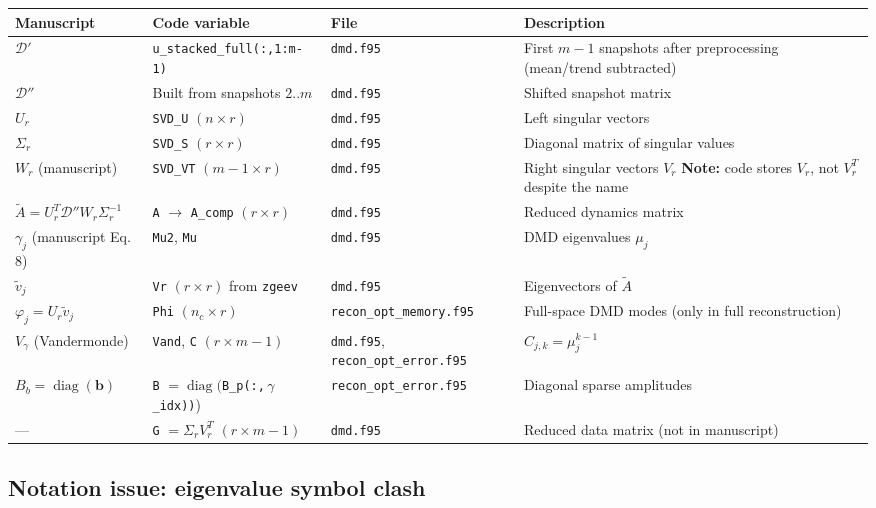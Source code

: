 \documentclass[11pt,a4paper]{article}
\newcommand{\diag}{\operatorname{diag}}
\begin{document}
\begin{center}
\renewcommand{\arraystretch}{1.25}
\begin{tabular}{@{}lll p{6.2cm}@{}}
\toprule
\textbf{Manuscript} & \textbf{Code variable} & \textbf{File} & \textbf{Description} \\
\midrule
$\mathcal{D}'$ & \texttt{u\_stacked\_full(:,1:m-1)} & \texttt{dmd.f95} & First $m{-}1$ snapshots after preprocessing (mean/trend subtracted) \\
$\mathcal{D}''$ & Built from snapshots $2..m$ & \texttt{dmd.f95} & Shifted snapshot matrix \\
$U_r$ & \texttt{SVD\_U} $(n \times r)$ & \texttt{dmd.f95} & Left singular vectors \\
$\Sigma_r$ & \texttt{SVD\_S} $(r \times r)$ & \texttt{dmd.f95} & Diagonal matrix of singular values \\
$W_r$ (manuscript) & \texttt{SVD\_VT} $(m{-}1 \times r)$ & \texttt{dmd.f95} & Right singular vectors $V_r$ \newline \textbf{Note:} code stores $V_r$, not $V_r^T$ despite the name \\
$\tilde{A}=U_r^T\mathcal{D}''W_r\Sigma_r^{-1}$ & \texttt{A} $\to$ \texttt{A\_comp} $(r\times r)$ & \texttt{dmd.f95} & Reduced dynamics matrix \\
$\gamma_j$ (manuscript Eq.\,8) & \texttt{Mu2}, \texttt{Mu} & \texttt{dmd.f95} & DMD eigenvalues $\mu_j$ \\
$\tilde{v}_j$ & \texttt{Vr} $(r \times r)$ from \texttt{zgeev} & \texttt{dmd.f95} & Eigenvectors of $\tilde{A}$ \\
$\varphi_j = U_r \tilde{v}_j$ & \texttt{Phi} $(n_c \times r)$ & \texttt{recon\_opt\_memory.f95} & Full-space DMD modes (only in full reconstruction) \\
$V_\gamma$ (Vandermonde) & \texttt{Vand}, \texttt{C} $(r \times m{-}1)$ & \texttt{dmd.f95}, \texttt{recon\_opt\_error.f95} & $C_{j,k} = \mu_j^{k-1}$ \\
$B_b = \diag(\bm{b})$ & \texttt{B} $= \diag($\texttt{B\_p(:,}\,$\gamma$\texttt{\_idx))}) & \texttt{recon\_opt\_error.f95} & Diagonal sparse amplitudes \\
--- & \texttt{G} $= \Sigma_r V_r^T$ $(r \times m{-}1)$ & \texttt{dmd.f95} & Reduced data matrix (not in manuscript) \\
\bottomrule
\end{tabular}
\end{center}

\subsection{Notation issue: eigenvalue symbol clash}
\label{sec:notation}
\end{document}
